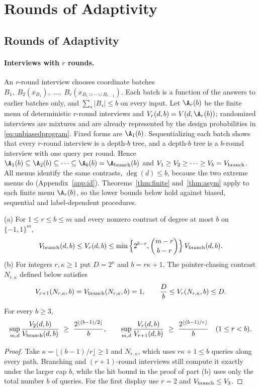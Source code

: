 \section{Rounds of Adaptivity}\label{app:D}
\subsection{Rounds of Adaptivity}\label{app:roundshier}
\paragraph{Interviews with $r$ rounds.}
An $r$-round interview chooses coordinate batches
$B_1,\;B_2(x_{B_1}),\;\ldots,\;B_r(x_{B_1\cup\cdots\cup B_{r-1}})$.
Each batch is a function of the answers to earlier batches only, and
$\sum_s|B_s|\le b$ on every input. Let $\A_r(b)$ be the finite menu of
deterministic $r$-round interviews and $V_r(d,b)=V(d,\A_r(b))$; randomized
interviews are mixtures and are already represented by the design
probabilities in \eqref{eq:unbiasedprogram}. Fixed forms are $\A_1(b)$.
Sequentializing each batch shows that every $r$-round interview is a depth-$b$
tree, and a depth-$b$ tree is a $b$-round interview with one query per round.
Hence $\A_1(b)\subseteq\A_2(b)\subseteq\cdots\subseteq\A_b(b)=\A_{\rm branch}(b)$
and $V_1\ge V_2\ge\cdots\ge V_b=V_{\rm branch}$. All menus identify the same
contrasts, $\deg(d)\le b$, because the two extreme menus do
(Appendix~\ref{app:id}). Theorems~\ref{thm:finite} and~\ref{thm:asym} apply to
each finite menu $\A_r(b)$, so the lower bounds below hold against biased,
sequential and label-dependent procedures.

\begin{theorem}\label{thm:roundsfull}
\textup{(a)} For $1\le r\le b\le m$ and every nonzero contrast of degree at most $b$ on $\{-1,1\}^m$,
\[
 V_{\rm branch}(d,b)\le V_r(d,b)\le
 \min\Big\{2^{b-r},\binom{m-r}{b-r}\Big\}\,V_{\rm branch}(d,b).
\]
\textup{(b)} For integers $r,\kappa\ge1$ put $D=2^\kappa$ and $b=r\kappa+1$.
The pointer-chasing contrast $N_{r,\kappa}$ defined below satisfies
\[
 V_{r+1}(N_{r,\kappa},b)=V_{\rm branch}(N_{r,\kappa},b)=1,\qquad
 \frac{D}{b}\le V_r(N_{r,\kappa},b)\le D.
\]
\end{theorem}

\begin{corollary}\label{cor:tworounds}
For every $b\ge3$,
\[
 \sup_{m,d}\frac{V_2(d,b)}{V_{\rm branch}(d,b)}\ \ge\ \frac{2^{\lfloor(b-1)/2\rfloor}}{b},
 \qquad
 \sup_{m,d}\frac{V_r(d,b)}{V_{r+1}(d,b)}\ \ge\ \frac{2^{\lfloor(b-1)/r\rfloor}}{b}
 \quad(1\le r<b).
\]
\end{corollary}
\begin{proof}
Take $\kappa=\lfloor(b-1)/r\rfloor\ge1$ and $N_{r,\kappa}$, which uses
$r\kappa+1\le b$ queries along every path. Branching and $(r+1)$-round
interviews still compute it exactly under the larger cap $b$, while the hit
bound in the proof of part (b) uses only the total number $b$ of queries.
For the first display use $r=2$ and $V_{\rm branch}\le V_3$.
\end{proof}

